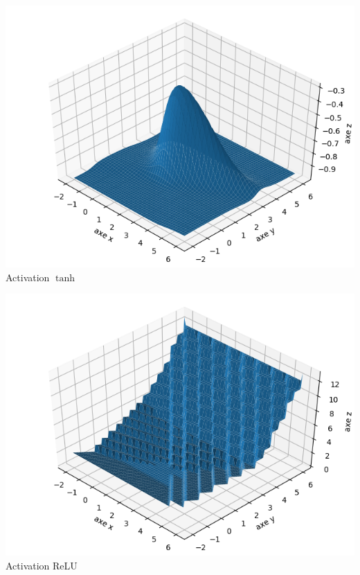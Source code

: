 \documentclass[11pt,class=report,crop=false]{standalone}
\begin{document}
\begin{exemple}
\begin{center}
\begin{minipage}{0.4\textwidth}
\center
\includegraphics[scale=\myscale,scale=0.4]{figures/neurones-surface-2-tanh}
Activation $\tanh$
\end{minipage}\quad
\begin{minipage}{0.4\textwidth}
\center
\includegraphics[scale=\myscale,scale=0.4]{figures/neurones-surface-2-relu}
Activation ReLU
\end{minipage}
\end{center}
\end{exemple}


\end{document}

